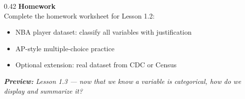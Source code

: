 \documentclass[aspectratio=169, 11pt]{beamer}
\begin{document}
{\begin{frame}[t, plain]
\begin{minipage}{0.9\textwidth}
\begin{columns}[T]
      \begin{column}{0.42\textwidth}
        \small
        {\color{goldacc}\bfseries Homework}\\[5pt]
        {\color{skymid}Complete the homework worksheet for Lesson 1.2:}\\[5pt]
        \begin{itemize}
          \setlength{\itemsep}{0.35em}\setlength{\topsep}{0em}
          \item {\color{white}NBA player dataset: classify all variables
            with justification}
          \item {\color{white}AP-style multiple-choice practice}
          \item {\color{white}Optional extension: real dataset from
            CDC or Census}
        \end{itemize}
        \vspace{0.45cm}
        {\color{skymid}\itshape\small
          \textbf{Preview:} Lesson 1.3 --- now that we know a variable is
          categorical, how do we display and summarize it?}
      \end{column}

    \end{columns}
  \end{minipage}
\end{frame}
}
\end{document}
